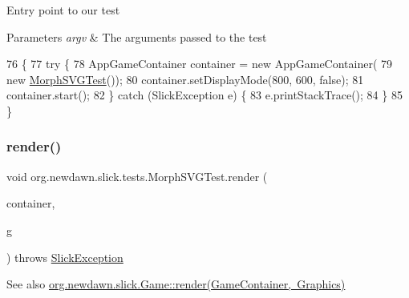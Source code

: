 Entry point to our test


\begin{DoxyParams}{Parameters}
{\em argv} & The arguments passed to the test \\
\hline
\end{DoxyParams}

\begin{DoxyCode}
76                                            \{
77         \textcolor{keywordflow}{try} \{
78             AppGameContainer container = \textcolor{keyword}{new} AppGameContainer(
79                     \textcolor{keyword}{new} \mbox{\hyperlink{classorg_1_1newdawn_1_1slick_1_1tests_1_1_morph_s_v_g_test_a81c7ae3211150308d5a3f51b5870eb89}{MorphSVGTest}}());
80             container.setDisplayMode(800, 600, \textcolor{keyword}{false});
81             container.start();
82         \} \textcolor{keywordflow}{catch} (SlickException e) \{
83             e.printStackTrace();
84         \}
85     \}
\end{DoxyCode}
\mbox{\label{classorg_1_1newdawn_1_1slick_1_1tests_1_1_morph_s_v_g_test_a5cface01ccba85c788713be17cd8a112}} 
\subsubsection{\texorpdfstring{render()}{render()}}
{\footnotesize\ttfamily void org.\+newdawn.\+slick.\+tests.\+Morph\+S\+V\+G\+Test.\+render (\begin{DoxyParamCaption}\item[{\mbox{\hyperlink{classorg_1_1newdawn_1_1slick_1_1_game_container}{Game\+Container}}}]{container,  }\item[{\mbox{\hyperlink{classorg_1_1newdawn_1_1slick_1_1_graphics}{Graphics}}}]{g }\end{DoxyParamCaption}) throws \mbox{\hyperlink{classorg_1_1newdawn_1_1slick_1_1_slick_exception}{Slick\+Exception}}\hspace{0.3cm}{\ttfamily [inline]}}

\begin{DoxySeeAlso}{See also}
\mbox{\hyperlink{interfaceorg_1_1newdawn_1_1slick_1_1_game_af1a4670d43eb3ba04dfcf55ab1975b64}{org.\+newdawn.\+slick.\+Game\+::render(\+Game\+Container, Graphics)}} 
\end{DoxySeeAlso}


